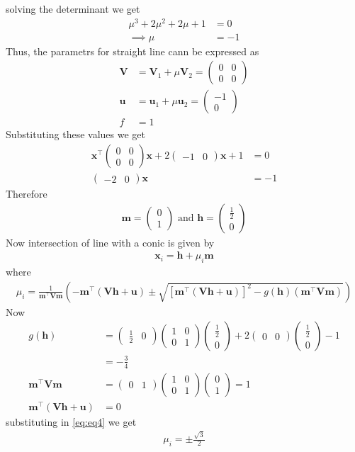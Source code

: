 \documentclass[12pt]{article}
\providecommand{\sbrak}[1]{\ensuremath{{}\left[#1\right]}}
\providecommand{\brak}[1]{\ensuremath{\left(#1\right)}}
\newcommand{\myvec}[1]{\ensuremath{\begin{pmatrix}#1\end{pmatrix}}}
\let\vec\mathbf
\begin{document}
solving the determinant we get
\begin{align}
	\mu^3+2\mu^2+2\mu+1&=0\\
	\implies \mu &= -1
\end{align}
Thus, the parametrs for straight line cann be expressed as
\begin{align}
	\vec{V} &= \vec{V}_1+\mu\vec{V}_2 = \myvec{0&0\\0&0}\\
	\vec{u} &= \vec{u}_1+\mu\vec{u}_2 = \myvec{-1\\0}\\
	f &= 1
\end{align}
Substituting these values we get
\begin{align}
	\vec{x}^\top\myvec{0&0\\0&0}\vec{x} + 2\myvec{-1&0}\vec{x} + 1 &= 0\\
	\myvec{-2&0}\vec{x} &= -1 
\end{align}
Therefore
\begin{align}
	\vec{m} = \myvec{0\\1} \text{ and } \vec{h} = \myvec{\frac{1}{2}\\0}
\end{align}
Now intersection of line with a conic is given by
\begin{align}
	\vec{x}_i=\vec{h}+\mu_i\vec{m}
\end{align}
where
\begin{align}
	\label{eq:eq4}
	\mu_i=\frac{1}{\vec{m}^\top\vec{V}\vec{m}}\brak{-\vec{m}^\top\brak{\vec{V}\vec{h}+\vec{u}}\pm\sqrt{\sbrak{\vec{m}^\top\brak{\vec{V}\vec{h}+\vec{u}}}^2-g\brak{\vec{h}}\brak{\vec{m}^\top\vec{V}\vec{m}}}}
\end{align}
Now
\begin{align}
	g\brak{\vec{h}}&=\myvec{\frac{1}{2}&0}\myvec{1&0\\0&1}\myvec{\frac{1}{2}\\0}+2\myvec{0&0}\myvec{\frac{1}{2}\\0}-1\\
	&= -\frac{3}{4}\\
	\vec{m}^\top\vec{V}\vec{m} &= \myvec{0&1}\myvec{1&0\\0&1}\myvec{0\\1} = 1\\
	\vec{m}^\top\brak{\vec{V}\vec{h}+\vec{u}} &= 0
\end{align}
substituting in \eqref{eq:eq4} we get
\begin{align}
	\mu_i = \pm\frac{\sqrt{3}}{2}
\end{align}
\end{document}
